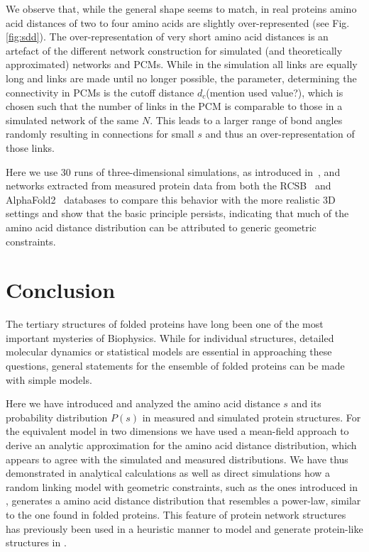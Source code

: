 \documentclass[
reprint,
twocolumn,
amsmath,amssymb,superscriptaddress,aps,
pre]{revtex4-1}
\newcommand{\blue}[1]{\textcolor{blue!80!black}{#1}}
\begin{document}
We observe that, while the general shape seems to match, in real proteins amino acid distances of two to four amino acids are slightly over-represented (see Fig.\ref{fig:sdd}).
The over-representation of very short amino acid distances is an artefact of the different network construction for simulated (and theoretically approximated) networks and PCMs. While in the simulation all links are equally long and links are made until no longer possible, the parameter, determining the connectivity in PCMs is the cutoff distance $d_c$\blue{(mention used value?)}, which is chosen such that the number of links in the PCM is comparable to those in a simulated network of the same $N$. This leads to a larger range of bond angles randomly resulting in connections for small $s$ and thus an over-representation of those links.


Here we use 30 runs of three-dimensional simulations, as introduced in~\cite{molkenthin2020self}, and networks extracted from measured protein data from both the RCSB~\cite{PDB} and AlphaFold2~\cite{} databases to compare this behavior with the more realistic 3D settings and show that the basic principle persists, indicating that much of the amino acid distance distribution can be attributed to generic geometric constraints.
\section{Conclusion}
The tertiary structures of folded proteins have long been one of the most important mysteries of Biophysics. While for individual structures, detailed molecular dynamics or statistical models are essential in approaching these questions, general statements for the ensemble of folded proteins can be made with simple models.

Here we have introduced and analyzed the amino acid distance $s$ and its probability distribution $P(s)$ in measured and simulated protein structures. For the equivalent model in two dimensions we have used a mean-field approach to derive an analytic approximation for the amino acid distance distribution, which appears to agree with the simulated and measured distributions.
We have thus demonstrated in analytical calculations as well as direct simulations how a random linking model with geometric constraints, such as the ones introduced in \cite{molkenthin2016scaling, molkenthin2020self}, generates a amino acid distance distribution that resembles a power-law, similar to the one found in folded proteins. This feature of protein network structures has previously been used in a heuristic manner to model and generate protein-like structures in \cite{bartoli2008effecta}.
\end{document}
